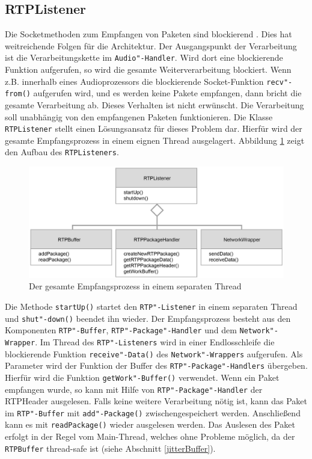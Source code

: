 \subsection{RTPListener}
\label{rtpListener}
Die Socketmethoden zum Empfangen von Paketen sind blockierend \cite{WinsockReference}. Dies hat weitreichende Folgen für die Architektur. Der Ausgangspunkt der Verarbeitung ist die Verarbeitungskette im \texttt{Audio"-Handler}. Wird dort eine blockierende Funktion aufgerufen, so wird die gesamte Weiterverarbeitung blockiert. Wenn z.B. innerhalb eines Audioprozessors die blockierende Socket-Funktion \texttt{recv"-from()} aufgerufen wird, und es werden keine Pakete empfangen, dann bricht die gesamte Verarbeitung ab. Dieses Verhalten ist nicht erwünscht. Die Verarbeitung soll unabhängig von den empfangenen Paketen funktionieren. Die Klasse \texttt{RTPListener} stellt einen Lösungsansatz für dieses Problem dar. Hierfür wird der gesamte Empfangsprozess in einem eignen Thread ausgelagert. Abbildung \ref{Fig:RTPListenerAdvanced} zeigt den Aufbau des \texttt{RTPListeners}.
\newline
\begin{figure}[htp]
\centering
\includegraphics[width=1\textwidth]{../img/RTPListenerAdvanced}
\caption{Der gesamte Empfangsprozess in einem separaten Thread}
\label{Fig:RTPListenerAdvanced}
\end{figure}

Die Methode \texttt{startUp()} startet den \texttt{RTP"-Listener} in einem separaten Thread und \texttt{shut"-down()} beendet ihn wieder. Der Empfangsprozess besteht aus den Komponenten \texttt{RTP"-Buffer}, \texttt{RTP"-Package"-Handler} und dem \texttt{Network"-Wrapper}. Im Thread des \texttt{RTP"-Listeners} wird in einer Endlosschleife die blockierende Funktion \texttt{receive"-Data()} des \texttt{Network"-Wrappers} aufgerufen. Als Parameter wird der Funktion der Buffer des \texttt{RTP"-Package"-Handlers} übergeben. Hierfür wird die Funktion \texttt{getWork"-Buffer()} verwendet. Wenn ein Paket empfangen wurde, so kann mit Hilfe von \texttt{RTP"-Package"-Handler} der RTPHeader ausgelesen. Falls keine weitere Verarbeitung nötig ist, kann das Paket im \texttt{RTP"-Buffer} mit \texttt{add"-Package()} zwischengespeichert werden. Anschließend kann es mit \texttt{readPackage()} wieder ausgelesen werden. Das Auslesen des Paket erfolgt in der Regel vom Main-Thread, welches ohne Probleme möglich, da der \texttt{RTPBuffer} thread-safe ist (siehe Abschnitt \ref{jitterBuffer}).

